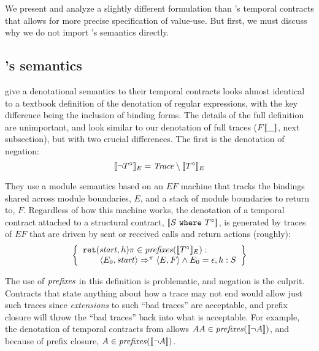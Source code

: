 
We present and analyze a slightly different formulation than \dfm's temporal contracts that allows for more precise specification of value-use.
%
But first, we must discuss why we do not import \dfm's semantics directly.
%
\subsection{\dfm's semantics}

\dfm{} give a denotational semantics to their temporal contracts looks almost identical to a textbook definition of the denotation of regular expressions, with the key difference being the inclusion of binding forms.
%
The details of the full definition are unimportant, and look similar to our denotation of full traces ($F[\![ \_ ]\!]$, next subsection), but with two crucial differences.
%
The first is the denotation of negation:
\newcommand{\denotedfm}[2]{\denote{#1}_{#2}}
\begin{equation*}
  \denotedfm{\stnot{\motcon}}{E} = \mathit{Trace} \setminus \denotedfm{\motcon}{E}
\end{equation*}

They use a module semantics based on an $\mathit{EF}$ machine that tracks the bindings shared across module boundaries, $E$, and a stack of module boundaries to return to, $F$.
%
Regardless of how this machine works, the denotation of a temporal contract attached to a structural contract, $[\![ S\ {\tt where}\ T^\circ ]\!]$, is generated by traces of $\mathit{EF}$ that are driven by sent or received calls and return actions (roughly):
\begin{align*}
 \left\{
   \begin{array}{l}
    {\tt ret}(\mathit{start},h)\mtrace \in \prefixes(\denotedfm{\motcon}{E}) :
 \\ \qquad\langle E_0, \mathit{start}\rangle \Rightarrow^\mtrace \langle E, F\rangle \wedge E_0 = \epsilon, h : S
\end{array}\right\}
\end{align*}

The use of $\mathit{prefixes}$ in this definition is problematic, and negation is the culprit.
%
Contracts that state anything about how a trace may not end would allow just such traces since \emph{extensions} to such ``bad traces'' are acceptable, and prefix closure will throw the ``bad traces'' back into what is acceptable.
%
%
For example, the denotation of temporal contracts from \dfm{} allows $AA \in \mathit{prefixes}([\![ \neg A ]\!])$, and because of prefix closure, $A \in \mathit{prefixes}([\![ \neg A ]\!])$.

